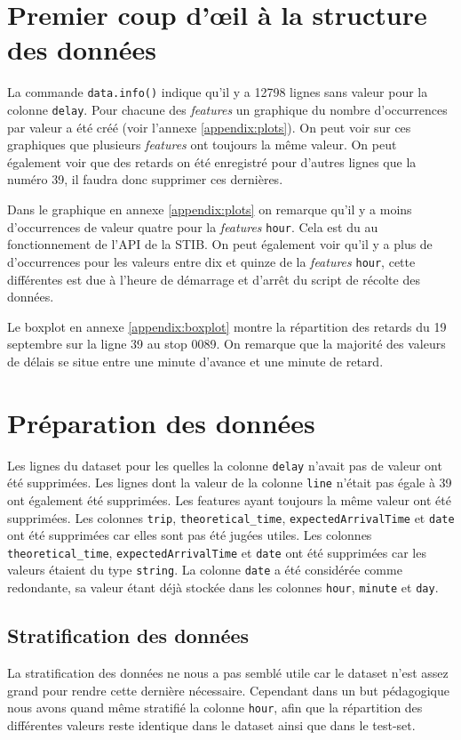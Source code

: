 \section{Premier coup d'œil à la structure des données}
La commande \lstinline!data.info()! indique qu'il y a 12798 lignes sans valeur pour la colonne \lstinline!delay!. Pour chacune des \textit{features} un graphique du nombre d'occurrences par valeur a été créé (voir l'annexe \ref{appendix:plots}). On peut voir sur ces graphiques que plusieurs \textit{features} ont toujours la même valeur. On peut également voir que des retards on été enregistré pour d'autres lignes que la numéro 39, il faudra donc supprimer ces dernières.

Dans le graphique en annexe \ref{appendix:plots} on remarque qu'il y a moins d'occurrences de valeur quatre pour la \textit{features} \lstinline!hour!. Cela est du au fonctionnement de l'API de la STIB. On peut également voir qu'il y a plus de d'occurrences pour les valeurs entre dix et quinze de la \textit{features} \lstinline!hour!, cette différentes est due à l'heure de démarrage et d'arrêt du script de récolte des données.

Le boxplot en annexe \ref{appendix:boxplot} montre la répartition des retards du 19 septembre sur la ligne 39 au stop 0089. On remarque que la majorité des valeurs de délais se situe entre une minute d'avance et une minute de retard.

\section{Préparation des données}
Les lignes du dataset pour les quelles la colonne \lstinline!delay! n'avait pas de valeur ont été supprimées. Les lignes dont la valeur de la colonne \lstinline!line! n'était pas égale à 39 ont également été supprimées. Les features ayant toujours la même valeur ont été supprimées. Les colonnes \lstinline!trip!, \lstinline!theoretical_time!, \lstinline!expectedArrivalTime! et \lstinline!date! ont été supprimées car elles sont pas été jugées utiles. Les colonnes \lstinline!theoretical_time!, \lstinline!expectedArrivalTime! et \lstinline!date! ont été supprimées car les valeurs étaient du type \lstinline!string!. La colonne \lstinline!date! a été considérée comme redondante, sa valeur étant déjà stockée dans les colonnes \lstinline!hour!, \lstinline!minute! et \lstinline!day!.

\subsection{Stratification des données}
La stratification des données ne nous a pas semblé utile car le dataset n'est assez grand pour rendre cette dernière nécessaire. Cependant dans un but pédagogique nous avons quand même stratifié la colonne \lstinline!hour!, afin que la répartition des différentes valeurs reste identique dans le dataset ainsi que dans le test-set.

